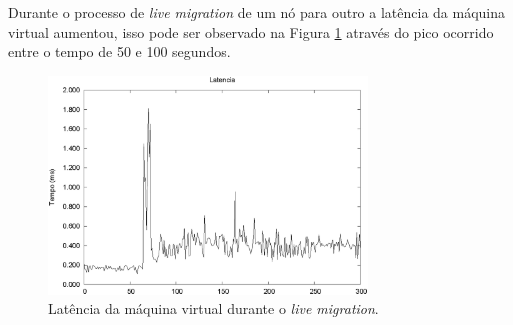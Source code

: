 % 

Durante o processo de \textit{live migration} de um nó para outro a latência da máquina virtual aumentou, isso pode ser observado na Figura 
\ref{fig:teste2_latencia} através do pico ocorrido entre o tempo de 50 e 100 segundos. 
\begin{figure}[h!]
 \centering
 \includegraphics[width=320px]{img/teste2_latencia.eps}
 \caption{Latência da máquina virtual durante o \textit{live migration}.}
 \label{fig:teste2_latencia}
\end{figure}




